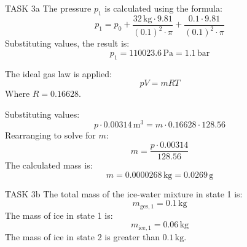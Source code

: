 TASK 3a  
The pressure \( p_1 \) is calculated using the formula:  
\[
p_1 = p_0 + \frac{32 \, \text{kg} \cdot 9.81}{(0.1)^2 \cdot \pi} + \frac{0.1 \cdot 9.81}{(0.1)^2 \cdot \pi}
\]  
Substituting values, the result is:  
\[
p_1 = 110023.6 \, \text{Pa} = 1.1 \, \text{bar}
\]  

The ideal gas law is applied:  
\[
pV = mRT
\]  
Where \( R = 0.16628 \).  

Substituting values:  
\[
p \cdot 0.00314 \, \text{m}^3 = m \cdot 0.16628 \cdot 128.56
\]  
Rearranging to solve for \( m \):  
\[
m = \frac{p \cdot 0.00314}{128.56}
\]  
The calculated mass is:  
\[
m = 0.0000268 \, \text{kg} = 0.0269 \, \text{g}
\]  

TASK 3b  
The total mass of the ice-water mixture in state 1 is:  
\[
m_{\text{ges},1} = 0.1 \, \text{kg}
\]  
The mass of ice in state 1 is:  
\[
m_{\text{ice},1} = 0.06 \, \text{kg}
\]  
The mass of ice in state 2 is greater than \( 0.1 \, \text{kg} \).